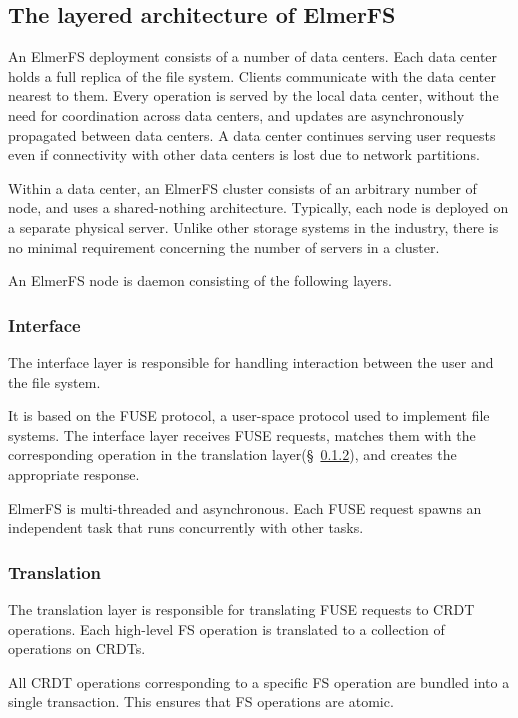 \documentclass[sigconf, anonymous, 10pt]{acmart}
\begin{document}
\subsection{The layered architecture of ElmerFS}

An ElmerFS deployment consists of a number of data centers.
Each data center holds a full replica of the file system.
Clients communicate with the data center nearest to them.
Every operation is served by the local data center, without the need
for coordination across data centers,
and updates are asynchronously propagated between data centers.
A data center continues serving user requests even if connectivity
with other data centers is lost due to network partitions.

Within a data center, an ElmerFS cluster consists of an arbitrary number
of node, and uses a shared-nothing architecture.
Typically, each node is deployed on a separate physical server.
Unlike other storage systems in the industry, there is no minimal
requirement concerning the number of servers in a cluster.

An ElmerFS node is daemon consisting of the following layers.

\subsubsection{Interface}

The interface layer is responsible for handling interaction between the user
and the file system.

It is based on the FUSE protocol, a user-space protocol used to implement
file systems. The interface layer receives FUSE requests,
matches them with the corresponding operation in
the translation layer(\S~\ref{sec:transaction_layer}), and creates the appropriate response.

ElmerFS is multi-threaded and asynchronous. Each FUSE request spawns an
independent task that runs concurrently with other tasks.

\subsubsection{Translation}
\label{sec:transaction_layer}
The translation layer is responsible for translating FUSE requests
to CRDT operations. Each high-level FS operation is translated
to a collection of operations on CRDTs.

All CRDT operations corresponding to a specific FS operation are bundled into
a single transaction. This ensures that FS operations are atomic.
\end{document}

